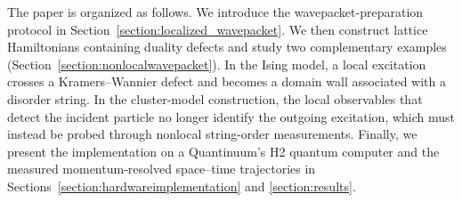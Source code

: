 \documentclass[aps,floatfix,10pt,amssymb,amsfont,amsmath,superscriptaddress,float,nofootinbib,longbibliography,nobalancelastpage,twocolumn]{revtex4-2}
\begin{document}
The paper is organized as follows. We introduce the wavepacket-preparation protocol in Section~\ref{section:localized_wavepacket}. We then construct lattice Hamiltonians containing duality defects and study two complementary examples (Section~\ref{section:nonlocalwavepacket}). In the Ising model, a local excitation crosses a Kramers–Wannier defect and becomes a domain wall associated with a disorder string. In the cluster-model construction, the local observables that detect the incident particle no longer identify the outgoing excitation, which must instead be probed through nonlocal string-order measurements. Finally, we present the implementation on a Quantinuum's H2 quantum computer and the measured momentum-resolved space--time trajectories in Sections~\ref{section:hardwareimplementation} and \ref{section:results}.




\end{document}
